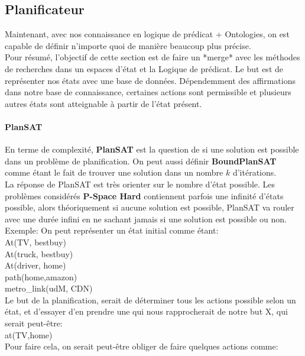 \documentclass[oneside]{book}
\begin{document}
\subsection{Planificateur}
Maintenant, avec nos connaissance en logique de prédicat + Ontologies, on est capable de définir n'importe quoi de manière beaucoup plus précise.\\
Pour résumé, l'objectif de cette section est de faire un *merge* avec les méthodes de recherches dans un espaces d'état et la Logique de prédicat. Le but est de représenter nos états avec une base de données. Dépendemment des affirmations dans notre base de connaissance, certaines actions sont permissible et plusieurs autres états sont atteignable à partir de l'état présent.\\

\paragraph{PlanSAT} En terme de complexité, \textbf{PlanSAT} est la question de si une solution est possible dans un problème de planification. On peut aussi définir \textbf{BoundPlanSAT} comme étant le fait de trouver une solution dans un nombre $k$ d'itérations.\\

La réponse de PlanSAT est très orienter sur le nombre d'état possible. Les problèmes considérés \textbf{P-Space Hard} contiennent parfois une infinité d'états possible, alors théoriquement si aucune solution est possible, PlanSAT va rouler avec une durée infini en ne sachant jamais si une solution est possible ou non.\\



Exemple: On peut représenter un état initial comme étant:\\
At(TV, bestbuy)\\
At(truck, bestbuy)\\
At(driver, home)\\
path(home,amazon)\\
metro\_link(udM, CDN)\\

Le but de la planification, serait de déterminer tous les actions possible selon un état, et d'essayer d'en prendre une qui nous rapprocherait de notre but X, qui serait peut-être:\\

at(TV,home)\\

Pour faire cela, on serait peut-être obliger de faire quelques actions comme:\\
\end{document}
